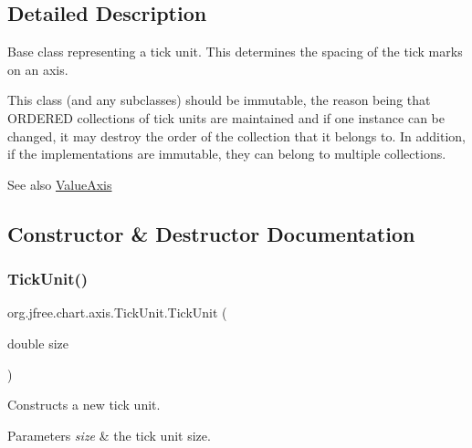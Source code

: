 \subsection{Detailed Description}
Base class representing a tick unit. This determines the spacing of the tick marks on an axis. 

This class (and any subclasses) should be immutable, the reason being that O\+R\+D\+E\+R\+ED collections of tick units are maintained and if one instance can be changed, it may destroy the order of the collection that it belongs to. In addition, if the implementations are immutable, they can belong to multiple collections.

\begin{DoxySeeAlso}{See also}
\mbox{\hyperlink{classorg_1_1jfree_1_1chart_1_1axis_1_1_value_axis}{Value\+Axis}} 
\end{DoxySeeAlso}


\subsection{Constructor \& Destructor Documentation}
\mbox{\label{classorg_1_1jfree_1_1chart_1_1axis_1_1_tick_unit_a522e33e366d5ab9c1fbef59e9f3c0739}} 
\subsubsection{\texorpdfstring{Tick\+Unit()}{TickUnit()}\hspace{0.1cm}{\footnotesize\ttfamily [1/2]}}
{\footnotesize\ttfamily org.\+jfree.\+chart.\+axis.\+Tick\+Unit.\+Tick\+Unit (\begin{DoxyParamCaption}\item[{double}]{size }\end{DoxyParamCaption})}

Constructs a new tick unit.


\begin{DoxyParams}{Parameters}
{\em size} & the tick unit size. \\
\hline
\end{DoxyParams}
\mbox{\label{classorg_1_1jfree_1_1chart_1_1axis_1_1_tick_unit_a5c321f74b766b72190be386d3542e788}} 
